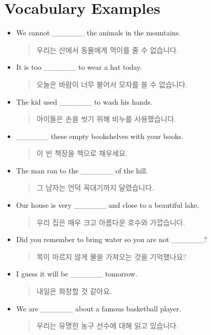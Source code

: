 \documentclass{article}
\begin{document}
\section*{Vocabulary Examples}
\begin{addmargin}[1em]{1em}
\begin{itemize}
    \item We cannot \_\_\_\_\_\_ the animals in the mountains.
    \begin{quote}
    우리는 산에서 동물에게 먹이를 줄 수 없습니다.
    \end{quote}
    \item It is too \_\_\_\_\_\_ to wear a hat today.
    \begin{quote}
    오늘은 바람이 너무 불어서 모자를 쓸 수 없습니다.
    \end{quote}
    \item The kid used \_\_\_\_\_\_ to wash his hands.
    \begin{quote}
    아이들은 손을 씻기 위해 비누를 사용했습니다.
    \end{quote}
    \item \_\_\_\_\_\_ these empty bookshelves with your books.
    \begin{quote}
    이 빈 책장을 책으로 채우세요.
    \end{quote}
    \item The man ran to the \_\_\_\_\_\_ of the hill.
    \begin{quote}
    그 남자는 언덕 꼭대기까지 달렸습니다.
    \end{quote}
    \item Our house is very \_\_\_\_\_\_ and close to a beautiful lake.
    \begin{quote}
    우리 집은 매우 크고 아름다운 호수와 가깝습니다.
    \end{quote}
    \item Did you remember to bring water so you are not \_\_\_\_\_\_?
    \begin{quote}
    목이 마르지 않게 물을 가져오는 것을 기억했나요?
    \end{quote}
    \item I guess it will be \_\_\_\_\_\_ tomorrow.
    \begin{quote}
    내일은 화창할 것 같아요.
    \end{quote}
    \item We are \_\_\_\_\_\_ about a famous basketball player.
    \begin{quote}
    우리는 유명한 농구 선수에 대해 읽고 있습니다.

\end{quote}
\end{itemize}
\end{addmargin}
\end{document}
